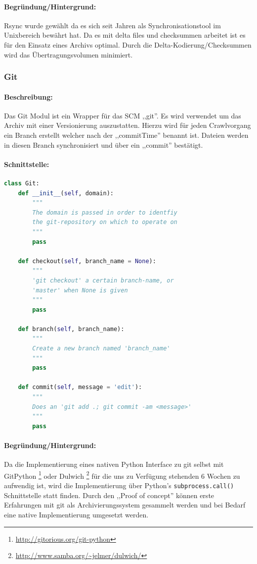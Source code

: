 \paragraph{Begründung/Hintergrund:}
\label{par:begr_ndung_hintergrund_}
Rsync wurde gewählt da es sich seit Jahren als Synchronisationstool im Unixbereich bewährt hat.
Da es mit delta files und checksummen arbeitet ist es für den Einsatz eines Archivs optimal.
Durch die Delta-Kodierung/Checksummen wird das Übertragungsvolumen minimiert.


\subsubsection{Git}
\label{ssub:git}
\paragraph{Beschreibung:}
\label{par:beschreibung_}
Das Git Modul ist ein Wrapper für das SCM ,,git''. Es wird verwendet um das Archiv mit einer Versionierung auszustatten. Hierzu wird für jeden Crawlvorgang ein Branch erstellt welcher nach der ,,commitTime'' benannt ist. 
Dateien werden in diesen Branch synchronisiert und über ein ,,commit'' bestätigt.

\paragraph{Schnittstelle:}
\label{par:schnittstelle_}
\begin{lstlisting}[language=python]
class Git:
    def __init__(self, domain):
        """
        The domain is passed in order to identfiy
        the git-repository on which to operate on
        """
        pass

    def checkout(self, branch_name = None):
        """
        'git checkout' a certain branch-name, or 
        'master' when None is given
        """
        pass

    def branch(self, branch_name):
        """
        Create a new branch named 'branch_name'
        """
        pass

    def commit(self, message = 'edit'):
        """
        Does an 'git add .; git commit -am <message>'
        """
        pass
\end{lstlisting}

\paragraph{Begründung/Hintergrund:}
\label{par:begr_ndung_hintergrund_}
Da die Implementierung eines nativen Python Interface zu git selbst mit GitPython
\footnote{\url{http://gitorious.org/git-python}} oder Dulwich \footnote{\url{http://www.samba.org/~jelmer/dulwich/}}
für die uns zu Verfügung stehenden 6 Wochen zu aufwendig ist, wird die Implementierung über
Python's \texttt{subprocess.call()} Schnittstelle statt finden. Durch den ,,Proof of concept'' können
erste Erfahrungen mit git als Archivierungssystem gesammelt werden und bei Bedarf eine native Implementierung
umgesetzt werden.


